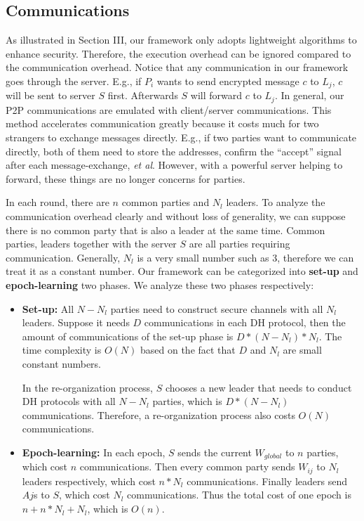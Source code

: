 \subsection{Communications}
As illustrated in Section III, our framework only adopts lightweight algorithms to enhance security. Therefore, the execution overhead can be ignored compared to the communication overhead. Notice that any communication in our framework goes through the server. E.g., if $P_i$ wants to send encrypted message $c$ to $L_j$, $c$ will be sent to server $S$ first. Afterwards $S$ will forward $c$ to $L_j$. In general, our P2P communications are emulated with client/server communications. This method accelerates communication greatly because it costs much for two strangers to exchange messages directly. E.g., if two parties want to communicate directly, both of them need to store the addresses, confirm the ``accept'' signal after each message-exchange, \emph{et al}. However, with a powerful server helping to forward, these things are no longer concerns for parties.

In each round, there are $n$ common parties and $N_l$ leaders. To analyze the communication overhead clearly and without loss of generality, we can suppose there is no common party that is also a leader at the same time. Common parties, leaders together with the server $S$ are all parties requiring communication. Generally, $N_l$ is a very small number such as 3, therefore we can treat it as a constant number. Our framework can be categorized into \textbf{set-up} and \textbf{epoch-learning} two phases. We analyze these two phases respectively:

\begin{itemize}
    \item \textbf{Set-up:} All $N-N_l$ parties need to construct secure channels with all $N_l$ leaders. Suppose it needs $D$ communications in each DH protocol, then the amount of communications of the set-up phase is $D * (N-N_l) * N_l$. The time complexity is $O(N)$ based on the fact that $D$ and $N_l$ are small constant numbers.
    
    In the re-organization process, $S$ chooses a new leader that needs to conduct DH protocols with all $N-N_l$ parties, which is $D * (N-N_l)$ communications. Therefore, a re-organization process also costs $O(N)$ communications.
    
    \item \textbf{Epoch-learning:} In each epoch, $S$ sends the current $W_{global}$ to $n$ parties, which cost $n$ communications. Then every common party sends $W_{ij}$ to $N_l$ leaders respectively, which cost $n * N_l$ communications. Finally leaders send $Aj$s to $S$, which cost $N_l$ communications. Thus the total cost of one epoch is $n + n * N_l + N_l$, which is $O(n)$.
\end{itemize}

